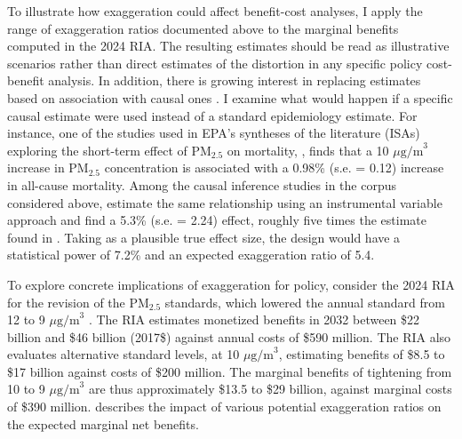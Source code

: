 \documentclass[12pt]{article}
\begin{document}
		To illustrate how exaggeration could affect benefit-cost analyses, I apply the range of exaggeration ratios documented above to the marginal benefits computed in the 2024 RIA. The resulting estimates should be read as illustrative scenarios rather than direct estimates of the distortion in any specific policy cost-benefit analysis. In addition, there is growing interest in replacing estimates based on association with causal ones \citep{dominici_best_2017, bind_causal_2019}. I examine what would happen if a specific causal estimate were used instead of a standard epidemiology estimate. For instance, one of the studies used in EPA's syntheses of the literature (ISAs) exploring the short-term effect of PM$_{2.5}$ on mortality, \cite{zanobetti_effect_2009}, finds that a 10 $\mu\text{g/m}^3$ increase in PM$_{2.5}$ concentration is associated with a 0.98\% (s.e. = 0.12) increase in all-cause mortality. Among the causal inference studies in the corpus considered above, \cite{schwartz_estimating_2015} estimate the same relationship using an instrumental variable approach and find a 5.3\% (s.e. = 2.24) effect, roughly five times the estimate found in \cite{zanobetti_effect_2009}. Taking \cite{zanobetti_effect_2009} as a plausible true effect size, the \cite{schwartz_estimating_2015} design would have a statistical power of 7.2\% and an expected exaggeration ratio of 5.4. %
		
		To explore concrete implications of exaggeration for policy, consider the 2024 RIA for the revision of the PM$_{2.5}$ standards, which lowered the annual standard from 12 to 9 $\mu\text{g/m}^3$ \citep{u.s.epa_final_2024}. The RIA estimates monetized benefits in 2032 between \$22 billion and \$46 billion (2017\$) against annual costs of \$590 million.  %
		The RIA also evaluates alternative standard levels, at 10 $\mu\text{g/m}^3$, estimating  benefits of \$8.5 to \$17 billion against costs of \$200 million. The marginal benefits of tightening from 10 to 9 $\mu\text{g/m}^3$ are thus approximately \$13.5 to \$29 billion, against marginal costs of \$390 million.  describes the impact of various potential exaggeration ratios on the expected marginal net benefits.
	
		
		
		
\end{document}

